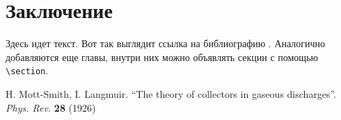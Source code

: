 \documentclass{mipt-thesis-ms}
\begin{document}
\chapter{Заключение}

Здесь идет текст. Вот так выглядит ссылка на библиографию \cite{langmuir26}. Аналогично добавляются еще главы, внутри них можно объявлять секции с помощью \verb|\section|.


\backmatter

\begin{thebibliography}{99}
        H. Mott-Smith, I. Langmuir. ``The theory of collectors in gaseous discharges''. \emph{Phys. Rev.} \textbf{28} (1926)
\end{thebibliography}
\end{document}
